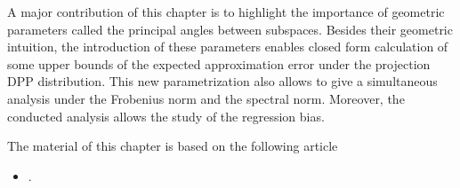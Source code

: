 \documentclass[twoside,11pt]{book}
\newtheorem{theorem}{Theorem}
\numberwithin{theorem}{chapter}
\numberwithin{definition}{chapter}
\numberwithin{proposition}{chapter}
\numberwithin{corollary}{chapter}
\numberwithin{example}{chapter}
\numberwithin{lemma}{chapter}
\numberwithin{assumption}{chapter}
\numberwithin{equation}{chapter}
\numberwithin{figure}{chapter}
\DeclareMathOperator{\Det}{Det}
\DeclareMathOperator{\Fr}{\mathrm{Fr}}
\DeclareMathOperator{\VS}{\mathrm{VS}}
\DeclareMathOperator{\Tran}{\intercal}
\DeclareMathOperator{\EX}{\mathbb{E}}
\DeclareMathOperator{\Prb}{\mathbb{P}}
\begin{document}
A major contribution of this chapter is to highlight the importance of geometric parameters called the principal angles between subspaces. Besides their geometric intuition, the introduction of these parameters enables closed form calculation of some upper bounds of the expected approximation error under the projection DPP distribution.
This new parametrization also allows to give a simultaneous analysis under the Frobenius norm and the spectral norm. Moreover, the conducted analysis allows the study of the  regression bias.








The material of this chapter
is based on the following article 
\begin{itemize}
\item {}.
\end{itemize}
\end{document}

